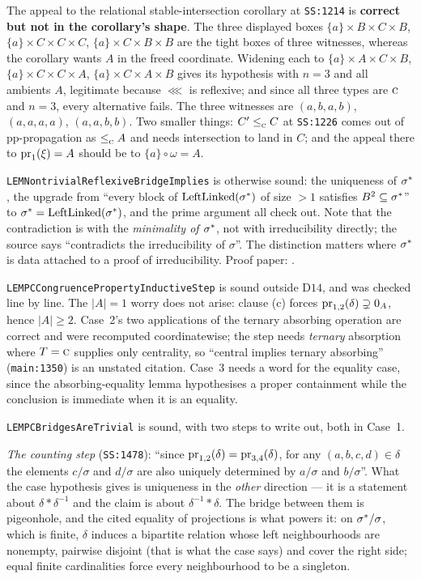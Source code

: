 The appeal to the relational stable-intersection corollary at \texttt{SS:1214}
is \textbf{correct but not in the corollary's shape}. The three displayed boxes
$\{a\}\times B\times C\times B$, $\{a\}\times C\times C\times C$,
$\{a\}\times C\times B\times B$ are the tight boxes of three witnesses, whereas
the corollary wants $A$ in the freed coordinate. Widening each to
$\{a\}\times A\times C\times B$, $\{a\}\times C\times C\times A$,
$\{a\}\times C\times A\times B$ gives its hypothesis with $n=3$ and all
ambients $A$, legitimate because $\lll$ is reflexive; and since all three types
are $\textup{\textsc{c}}$ and $n=3$, every alternative fails. The three witnesses are
$(a,b,a,b)$, $(a,a,a,a)$, $(a,a,b,b)$. Two smaller things: $C'\le_{\textup{\textsc{c}}}^{}C$ at
\texttt{SS:1226} comes out of pp-propagation as $\le_{\textup{\textsc{c}}}^{}A$ and needs
intersection to land in $C$; and the appeal there to $\operatorname*{pr}_{1}(\xi)=A$ should
be to $\{a\}\circ\omega=A$.

\texttt{LEMNontrivialReflexiveBridgeImplies} is otherwise sound: the uniqueness
of $\sigma^{*}$, the upgrade from ``every block of
$\operatorname{LeftLinked}(\sigma^{*})$ of size $>1$ satisfies
$B^{2}\subseteq\sigma^{*}$'' to $\sigma^{*}=
\operatorname{LeftLinked}(\sigma^{*})$, and the prime argument all check out.
Note that the contradiction is with the \emph{minimality of $\sigma^{*}$},
not with irreducibility directly; the source says ``contradicts the
irreducibility of $\sigma$''. The distinction matters where $\sigma^{*}$ is
data attached to a proof of irreducibility. Proof paper:
.

\texttt{LEMPCCongruencePropertyInductiveStep} is sound outside $\mathrm D14$,
and was checked line by line. The $|A|=1$ worry does not arise: clause (c)
forces $\operatorname*{pr}_{1,2}(\delta)\supsetneq0_{A}$, hence $|A|\ge2$. Case~2's two
applications of the ternary absorbing operation are correct and were recomputed
coordinatewise; the step needs \emph{ternary} absorption where $T=\textup{\textsc{c}}$ supplies
only centrality, so ``central implies ternary absorbing''
(\texttt{main:1350}) is an unstated citation. Case~3 needs a word for the
equality case, since the absorbing-equality lemma hypothesises a proper
containment while the conclusion is immediate when it is an equality.

\texttt{LEMPCBridgesAreTrivial} is sound, with two steps to write out, both in
Case~1.

\emph{The counting step} (\texttt{SS:1478}): ``since $\operatorname*{pr}_{1,2}(\delta)=
\operatorname*{pr}_{3,4}(\delta)$, for any $(a,b,c,d)\in\delta$ the elements $c/\sigma$ and
$d/\sigma$ are also uniquely determined by $a/\sigma$ and $b/\sigma$''. What
the case hypothesis gives is uniqueness in the \emph{other} direction --- it is
a statement about $\delta\ast\delta^{-1}$ and the claim is about
$\delta^{-1}\ast\delta$. The bridge between them is pigeonhole, and the cited
equality of projections is what powers it: on $\sigma^{*}/\sigma$, which is
finite, $\delta$ induces a bipartite relation whose left neighbourhoods are
nonempty, pairwise disjoint (that is what the case says) and cover the right
side; equal finite cardinalities force every neighbourhood to be a singleton.

